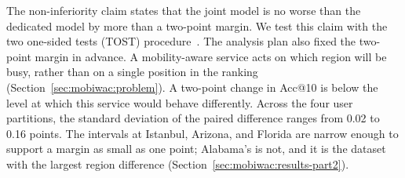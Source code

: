 The non-inferiority claim states that the joint model is no worse than the dedicated model by more than a two-point margin. We test this claim with the two one-sided tests (TOST) procedure~\cite{lakens2017tost}. The analysis plan also fixed the two-point margin in advance. A mobility-aware service acts on which region will be busy, rather than on a single position in the ranking (Section~\ref{sec:mobiwac:problem}). A two-point change in Acc@10 is below the level at which this service would behave differently. Across the four user partitions, the standard deviation of the paired difference ranges from 0.02 to 0.16 points. The intervals at Istanbul, Arizona, and Florida are narrow enough to support a margin as small as one point; Alabama's is not, and it is the dataset with the largest region difference (Section~\ref{sec:mobiwac:results-part2}).
